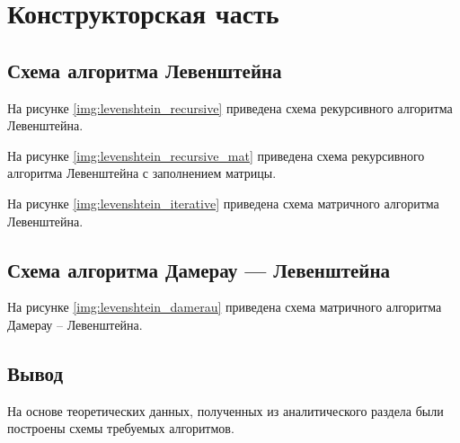 \chapter{Конструкторская часть}

\section{Схема алгоритма Левенштейна}

На рисунке \ref{img:levenshtein_recursive} приведена схема рекурсивного алгоритма Левенштейна.

На рисунке \ref{img:levenshtein_recursive_mat} приведена схема рекурсивного алгоритма Левенштейна с заполнением матрицы.

На рисунке \ref{img:levenshtein_iterative} приведена схема матричного алгоритма Левенштейна.

\section{Схема алгоритма Дамерау — Левенштейна}

На рисунке \ref{img:levenshtein_damerau} приведена схема матричного алгоритма Дамерау -- Левенштейна.

\section*{Вывод}

На основе теоретических данных, полученных из аналитического раздела были построены схемы требуемых алгоритмов.




